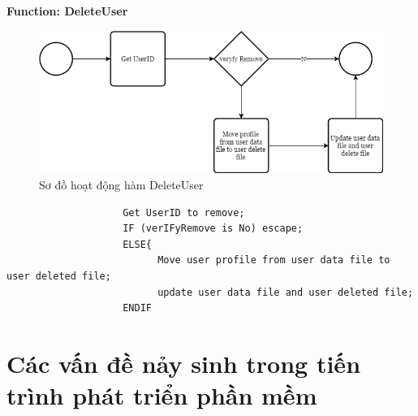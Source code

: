 \documentclass[12pt,a4paper]{report}
\begin{document}
                \newpage
                \textbf{Function: DeleteUser}
                \begin{figure}[H]
                    \centering
                    \label{F:deleteuser}
                    \includegraphics[scale = .4]{deleteuser.png}
                    \caption{Sơ đồ hoạt động hàm DeleteUser}
                \end{figure}
                \begin{verbatim}
                    Get UserID to remove;
                    IF (verIFyRemove is No) escape;
                    ELSE{
                          Move user profile from user data file to user deleted file;
                          update user data file and user deleted file;
                    ENDIF
                \end{verbatim}
\chapter{Các vấn đề nảy sinh trong tiến trình phát triển phần mềm}
\end{document}
